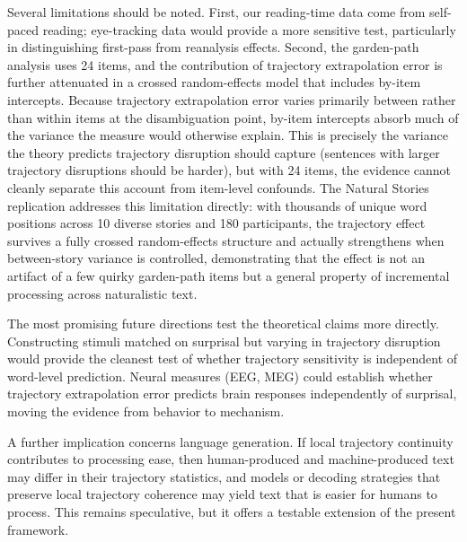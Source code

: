 \documentclass[12pt]{article}
\begin{document}
Several limitations should be noted. First, our reading-time data come from self-paced reading; eye-tracking data would provide a more sensitive test, particularly in distinguishing first-pass from reanalysis effects. Second, the garden-path analysis uses 24 items, and the contribution of trajectory extrapolation error is further attenuated in a crossed random-effects model that includes by-item intercepts. Because trajectory extrapolation error varies primarily between rather than within items at the disambiguation point, by-item intercepts absorb much of the variance the measure would otherwise explain. This is precisely the variance the theory predicts trajectory disruption should capture (sentences with larger trajectory disruptions should be harder), but with 24 items, the evidence cannot cleanly separate this account from item-level confounds. The Natural Stories replication addresses this limitation directly: with thousands of unique word positions across 10 diverse stories and 180 participants, the trajectory effect survives a fully crossed random-effects structure and actually strengthens when between-story variance is controlled, demonstrating that the effect is not an artifact of a few quirky garden-path items but a general property of incremental processing across naturalistic text.

The most promising future directions test the theoretical claims more directly. Constructing stimuli matched on surprisal but varying in trajectory disruption would provide the cleanest test of whether trajectory sensitivity is independent of word-level prediction. Neural measures (EEG, MEG) could establish whether trajectory extrapolation error predicts brain responses independently of surprisal, moving the evidence from behavior to mechanism.

A further implication concerns language generation. If local trajectory continuity contributes to processing ease, then human-produced and machine-produced text may differ in their trajectory statistics, and models or decoding strategies that preserve local trajectory coherence may yield text that is easier for humans to process. This remains speculative, but it offers a testable extension of the present framework.



\end{document}
